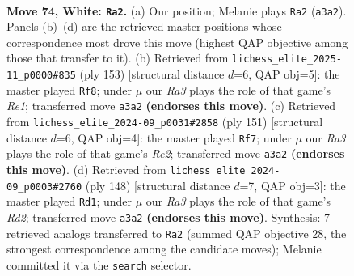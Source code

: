 \documentclass[11pt]{article}
\begin{document}
\clearpage

\begin{figure}[p]\centering
\begin{subfigure}{0.46\textwidth}\centering
\resizebox{\linewidth}{!}{%
\newchessgame
\chessboard[
  setfen={8/8/1k6/8/8/R2N2K1/6P1/7r w - - 12 74},
  showmover=false,
  pgfstyle=straightmove, color=movearrow, markmove={a3-a2}
]}
\caption{}
\end{subfigure}\hfill
\begin{subfigure}{0.46\textwidth}\centering
\resizebox{\linewidth}{!}{%
\newchessgame
\chessboard[
  setfen={4r3/7R/8/6p1/3K2k1/8/8/8 b - - 2 77},
  showmover=false,
  pgfstyle=straightmove, color=movearrow, markmove={e8-f8}
]}
\caption{}
\end{subfigure}
\\[4pt]
\begin{subfigure}{0.46\textwidth}\centering
\resizebox{\linewidth}{!}{%
\newchessgame
\chessboard[
  setfen={8/4r3/8/7R/8/8/3K2p1/6k1 b - - 7 76},
  showmover=false,
  pgfstyle=straightmove, color=movearrow, markmove={e7-f7}
]}
\caption{}
\end{subfigure}\hfill
\begin{subfigure}{0.46\textwidth}\centering
\resizebox{\linewidth}{!}{%
\newchessgame
\chessboard[
  setfen={8/K3k3/P7/1r6/8/8/3R4/8 w - - 15 75},
  showmover=false,
  pgfstyle=straightmove, color=movearrow, markmove={d2-d1}
]}
\caption{}
\end{subfigure}
\caption{\textbf{Move 74, White: \texttt{Ra2}.} (a) Our position; Melanie plays \texttt{Ra2} (\texttt{a3a2}). Panels (b)--(d) are the retrieved master positions whose correspondence most drove this move (highest QAP objective among those that transfer to it). (b) Retrieved from \texttt{lichess\_elite\_2025-11\_p0000\#835} (ply 153) [structural distance $d$=6, QAP obj=5]: the master played \texttt{Rf8}; under $\mu$ our \emph{Ra3} plays the role of that game's \emph{Re1}; transferred move \texttt{a3a2} \textbf{(endorses this move)}. (c) Retrieved from \texttt{lichess\_elite\_2024-09\_p0031\#2858} (ply 151) [structural distance $d$=6, QAP obj=4]: the master played \texttt{Rf7}; under $\mu$ our \emph{Ra3} plays the role of that game's \emph{Re2}; transferred move \texttt{a3a2} \textbf{(endorses this move)}. (d) Retrieved from \texttt{lichess\_elite\_2024-09\_p0003\#2760} (ply 148) [structural distance $d$=7, QAP obj=3]: the master played \texttt{Rd1}; under $\mu$ our \emph{Ra3} plays the role of that game's \emph{Rd2}; transferred move \texttt{a3a2} \textbf{(endorses this move)}. Synthesis: 7 retrieved analogs transferred to \texttt{Ra2} (summed QAP objective 28, the strongest correspondence among the candidate moves); Melanie committed it via the \texttt{search} selector.}
\label{fig:thought-m146}
\end{figure}
\end{document}
